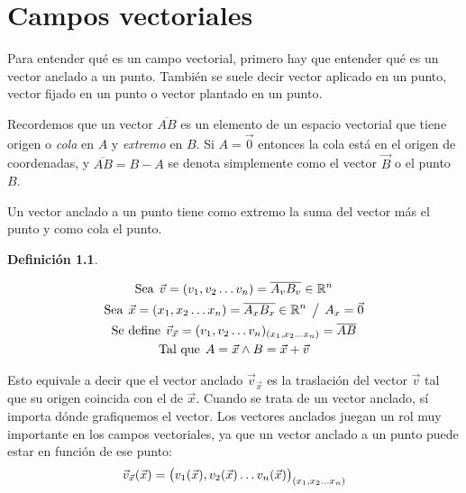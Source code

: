 \documentclass[a5paper,12pt,twoside]{book}
\newtheorem{defn}{{Definición}}[chapter]
\begin{document}
\chapter{Campos vectoriales}


Para entender qué es un campo vectorial, primero hay que entender qué es un vector anclado a un punto.
También se suele decir vector aplicado en un punto, vector fijado en un punto o vector plantado en un punto.

Recordemos que un vector $\overline{AB}$ es un elemento de un espacio vectorial que tiene origen o \emph{cola} en $A$ y \emph{extremo} en $B$.
Si $A=\Vec{0}$ entonces la cola está en el origen de coordenadas, y $\overline{AB}=B-A$ se denota simplemente como el vector $\Vec{B}$ o el punto $B$.

Un vector anclado a un punto tiene como extremo la suma del vector más el punto y como cola el punto.

\begin{mdframed}[style=DefinitionFrame]
    \begin{defn}
    \end{defn}
    \begin{gather*}
        \textrm{Sea} \hspace{1ex} \Vec{v} = (v_1,v_2 \dots v_n) = \overline{A_v B_v} \in \mathbb{R}^n
        \\
        \textrm{Sea} \hspace{1ex} \Vec{x} = (x_1,x_2 \dots x_n) = \overline{A_x B_x} \in \mathbb{R}^n \hspace{1ex} \big/ \hspace{1ex} A_x = \Vec{0}
        \\
        \textrm{Se define} \hspace{1ex} \Vec{v}_{\Vec{x}} = (v_1,v_2 \dots v_n)_{(x_1,x_2 \dots x_n)} = \overline{AB}
        \\
        \textrm{Tal que} \hspace{1ex} A=\Vec{x} \land B=\Vec{x}+\Vec{v}
    \end{gather*}
\end{mdframed}

Esto equivale a decir que el vector anclado $\Vec{v}_{\Vec{x}}$ es la traslación del vector $\Vec{v}$ tal que su origen coincida con el de $\Vec{x}$.
Cuando se trata de un vector anclado, sí importa dónde grafiquemos el vector.
Los vectores anclados juegan un rol muy importante en los campos vectoriales, ya que un vector anclado a un punto puede estar en función de ese punto:
\begin{equation*}
    \Vec{v}_{\Vec{x}} (\Vec{x}) = \big( v_1(\Vec{x}),v_2(\Vec{x}) \dots v_n(\Vec{x}) \big)_{(x_1,x_2 \dots x_n)}
\end{equation*}
\end{document}

